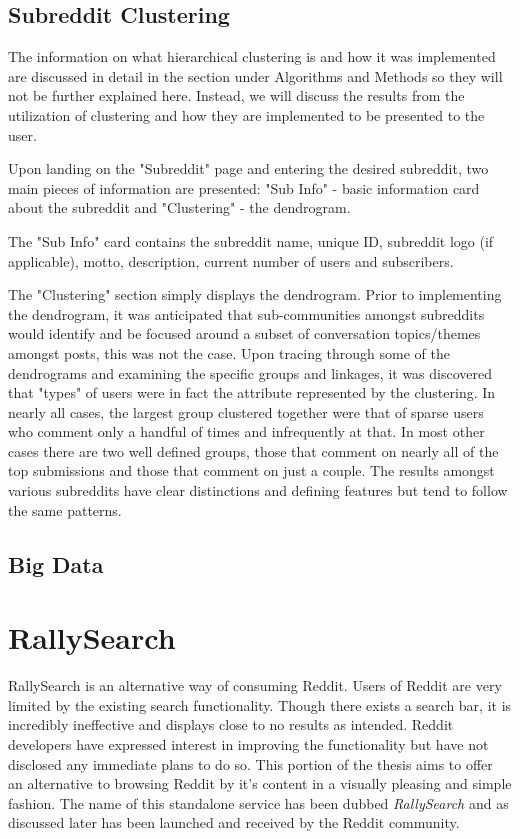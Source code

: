 \documentclass[msc,oneside]{ubcthesis}%
\begin{document}
\subsection{Subreddit Clustering}
The information on what hierarchical clustering is and how it was implemented are discussed in detail in the section under Algorithms and Methods so they will not be further explained here. Instead, we will discuss the results from the utilization of clustering and how they are implemented to be presented to the user.
\par
Upon landing on the "Subreddit" page and entering the desired subreddit, two main pieces of information are presented: "Sub Info" - basic information card about the subreddit and "Clustering" - the dendrogram.
\par
The "Sub Info" card contains the subreddit name, unique ID, subreddit logo (if applicable), motto, description, current number of users and subscribers.
\par
The "Clustering" section simply displays the dendrogram. Prior to implementing the dendrogram, it was anticipated that sub-communities amongst subreddits would identify and be focused around a subset of conversation topics/themes amongst posts, this was not the case. Upon tracing through some of the dendrograms and examining the specific groups and linkages, it was discovered that "types" of users were in fact the attribute represented by the clustering. In nearly all cases, the largest group clustered together were that of sparse users who comment only a handful of times and infrequently at that. In most other cases there are two well defined groups, those that comment on nearly all of the top submissions and those that comment on just a couple. The results amongst various subreddits have clear distinctions and defining features but tend to follow the same patterns.

\subsection{Big Data}


\section{RallySearch}
RallySearch is an alternative way of consuming Reddit. Users of Reddit are very limited by the existing search functionality. Though there exists a search bar, it is incredibly ineffective and displays close to no results as intended. Reddit developers have expressed interest in improving the functionality but have not disclosed any immediate plans to do so. This portion of the thesis aims to offer an alternative to browsing Reddit by it's content in a visually pleasing and simple fashion. The name of this standalone service has been dubbed \textit{RallySearch} and as discussed later has been launched and received by the Reddit community.
\end{document}

